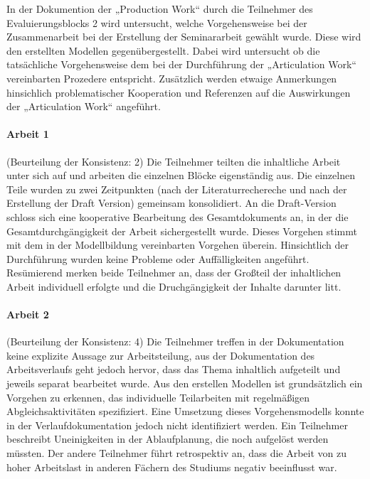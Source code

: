 In der Dokumention der „Production Work“ durch die Teilnehmer des Evaluierungsblocks 2 wird untersucht, welche Vorgehensweise bei der Zusammenarbeit bei der Erstellung der Seminararbeit gewählt wurde. Diese wird den erstellten Modellen gegenübergestellt. Dabei wird untersucht ob die tatsächliche Vorgehensweise dem bei der Durchführung der „Articulation Work“ vereinbarten Prozedere entspricht. Zusätzlich werden etwaige Anmerkungen hinsichlich problematischer Kooperation und Referenzen auf die Auswirkungen der „Articulation Work“ angeführt.

\paragraph{Arbeit 1} %
\label{par:arbeit_1}

(Beurteilung der Konsistenz: 2) Die Teilnehmer teilten die inhaltliche Arbeit unter sich auf und arbeiten die einzelnen Blöcke eigenständig aus. Die einzelnen Teile wurden zu zwei Zeitpunkten (nach der Literaturrechereche und nach der Erstellung der Draft Version) gemeinsam konsolidiert. An die Draft-Version schloss sich eine kooperative Bearbeitung des Gesamtdokuments an, in der die Gesamtdurchgängigkeit der Arbeit sichergestellt wurde. Dieses Vorgehen stimmt mit dem in der Modellbildung vereinbarten Vorgehen überein. Hinsichtlich der Durchführung wurden keine Probleme oder Auffälligkeiten angeführt. Resümierend merken beide Teilnehmer an, dass der Großteil der inhaltlichen Arbeit individuell erfolgte und die Druchgängigkeit der Inhalte darunter litt.


\paragraph{Arbeit 2} %
\label{par:arbeit_2}

(Beurteilung der Konsistenz: 4) Die Teilnehmer treffen in der Dokumentation keine explizite Aussage zur Arbeitsteilung, aus der Dokumentation des Arbeitsverlaufs geht jedoch hervor, dass das Thema inhaltlich aufgeteilt und jeweils separat bearbeitet wurde. Aus den erstellen Modellen ist grundsätzlich ein Vorgehen zu erkennen, das individuelle Teilarbeiten mit regelmäßigen Abgleichsaktivitäten spezifiziert. Eine Umsetzung dieses Vorgehensmodells konnte in der Verlaufdokumentation jedoch nicht identifiziert werden. Ein Teilnehmer beschreibt Uneinigkeiten in der Ablaufplanung, die noch aufgelöst werden müssten. Der andere Teilnehmer führt retrospektiv an, dass die Arbeit von zu hoher Arbeitslast in anderen Fächern des Studiums negativ beeinflusst war.  

